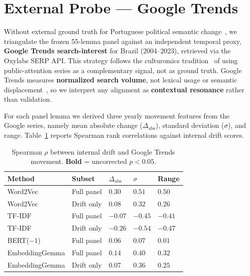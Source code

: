 \documentclass[12pt]{article}
\begin{document}
\section{External Probe --- Google Trends}
\label{sec:external_probe}

Without external ground truth for Portuguese political semantic
change~\cite{schlechtweg-etal-2020-semeval}, we triangulate the frozen
55-lemma panel against an independent temporal proxy, \textbf{Google Trends
search-interest} for Brazil (2004--2023), retrieved via the Oxylabs SERP API.
This strategy follows the culturomics
tradition~\cite{michel-etal-2011-quantitative,scheffer-etal-2021-rationality}
of using public-attention series as a complementary signal, not as ground
truth. Google Trends measures \textbf{normalized search volume}, not lexical
usage or semantic displacement~\cite{rovetta-2021-reliability-google-trends},
so we interpret any alignment as \textbf{contextual resonance} rather than
validation.

For each panel lemma we derived three yearly movement features from the Google
series, namely mean absolute change ($\Delta_{\mathrm{abs}}$), standard
deviation ($\sigma$), and range. Table~\ref{tab:external_correlations} reports
Spearman rank correlations against internal drift scores.

\begin{table}[H]
    \centering
    \footnotesize
    \caption{Spearman $\rho$ between internal drift and Google Trends movement.
    \textbf{Bold} = uncorrected $p < 0.05$.}
    \label{tab:external_correlations}
    \begin{tabularx}{\linewidth}{@{}l l >{\raggedleft\arraybackslash}X >{\raggedleft\arraybackslash}X >{\raggedleft\arraybackslash}X@{}}
        \toprule
        Method & Subset & $\Delta_{\mathrm{abs}}$ & $\sigma$ & Range \\
        \midrule
        Word2Vec & Full panel & $\bm{0.30}$ & $\bm{0.51}$ & $\bm{0.50}$ \\
        Word2Vec & Drift only & $0.08$ & $0.32$ & $0.26$ \\
        TF-IDF & Full panel & $-0.07$ & $\bm{-0.45}$ & $\bm{-0.41}$ \\
        TF-IDF & Drift only & $-0.26$ & $\bm{-0.54}$ & $\bm{-0.47}$ \\
        BERT($-1$) & Full panel & $0.06$ & $0.07$ & $0.01$ \\
        EmbeddingGemma & Full panel & $0.14$ & $\bm{0.40}$ & $\bm{0.32}$ \\
        EmbeddingGemma & Drift only & $0.07$ & $\bm{0.36}$ & $0.25$ \\
        \bottomrule
    \end{tabularx}
\end{table}
\end{document}

